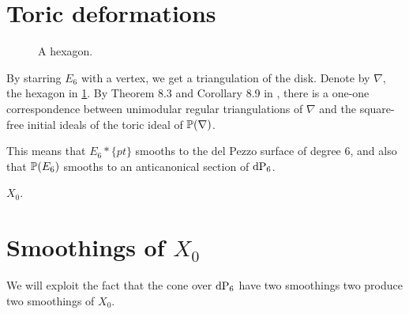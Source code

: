 \section{Toric deformations}

\begin{figure}
\centering
{}
\caption{A hexagon.}
\label{fig:hexagon}
\end{figure}

By starring $E_6$ with a vertex, we get a triangulation of the disk. Denote by $\nabla$, the hexagon in  \cref{fig:hexagon}. By Theorem 8.3 and Corollary 8.9 in \cite{sturmfels}, there is a one-one correspondence between unimodular regular triangulations of $\nabla$ and the square-free initial ideals of the toric ideal of $\P(\nabla)$. 

This means that $E_6 \ast \{ pt \}$ smooths to the del Pezzo surface of degree $6$, and also that $\P(E_6)$ smooths to an anticanonical section of $\dP6$. 


$X_0$.

\section[Smoothings of X0]{Smoothings of $X_0$}

We will exploit the fact that the cone over $\dP6$ have two smoothings two produce two smoothings of $X_0$.